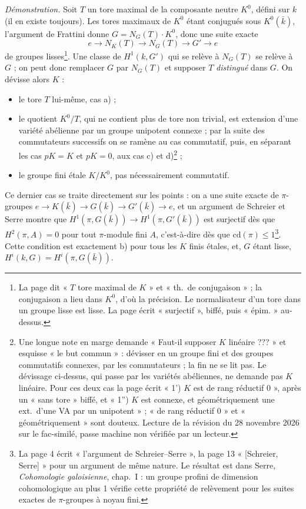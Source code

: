 \documentclass[11pt,a4paper]{article}
\begin{document}
\emph{Démonstration.} Soit $T$ un tore maximal de la composante neutre $K^0$,
défini sur $k$ (il en existe toujours). Les tores maximaux de $K^0$ étant
conjugués sous $K^0(\bar k)$, l'argument de Frattini donne $G = N_G(T) \cdot K^0$,
donc une suite exacte
\[
e \to N_K(T) \to N_G(T) \to G' \to e
\]
de groupes lisses\footnote{La page dit « $T$ tore maximal de $K$ » et « th.\ de
conjugaison » ; la conjugaison a lieu dans $K^0$, d'où la précision. Le
normalisateur d'un tore dans un groupe lisse est lisse. La page écrit
« surjectif », biffé, puis « épim. » au-dessus.}. Une classe de $H^1(k,G')$ qui
se relève à $N_G(T)$ se relève à $G$ ; on peut donc remplacer $G$ par $N_G(T)$ et
supposer $T$ \emph{distingué} dans $G$. On dévisse alors $K$ :
\begin{itemize}
\item le tore $T$ lui-même, cas a) ;
\item le quotient $K^0/T$, qui ne contient plus de tore non trivial, est
extension d'une variété abélienne par un groupe unipotent connexe ; par la
suite des commutateurs successifs on se ramène au cas commutatif, puis, en
séparant les cas $pK = K$ et $pK = 0$, aux cas c) et d)\footnote{Une longue
note en marge demande « Faut-il supposer $K$ linéaire ??? » et esquisse « le
but commun » : dévisser en un groupe fini et des groupes commutatifs connexes,
par les commutateurs ; la fin ne se lit pas. Le dévissage ci-dessus, qui passe
par les variétés abéliennes, ne demande pas $K$ linéaire. Pour ces deux cas la
page écrit « 1') $K$ est de rang réductif $0$ », après un « sans tore » biffé,
et « 1'') $K$ est connexe, et géométriquement une ext.\ d'une VA par un
unipotent » ; « de rang réductif $0$ » et « géométriquement » sont douteux.
Lecture de la révision du 28 novembre 2026 sur le fac-similé, passe machine non
vérifiée par un lecteur.} ;
\item le groupe fini étale $K/K^0$, pas nécessairement commutatif.
\end{itemize}
Ce dernier cas se traite directement sur les points : on a une suite exacte de
$\pi$-groupes $e \to K(\bar k) \to G(\bar k) \to G'(\bar k) \to e$, et un
argument de Schreier et Serre montre que $H^1(\pi,G(\bar k)) \to
H^1(\pi,G'(\bar k))$ est surjectif dès que $H^2(\pi,A) = 0$ pour tout $\pi$-module
fini $A$, c'est-à-dire dès que $\mathrm{cd}(\pi) \leq 1$\footnote{La page 4
écrit « l'argument de Schreier--Serre », la page 13 « [Schreier, Serre] » pour un
argument de même nature. Le résultat est dans Serre, \emph{Cohomologie galoisienne}, chap.~I : un groupe
profini de dimension cohomologique au plus 1 vérifie cette propriété de
relèvement pour les suites exactes de $\pi$-groupes à noyau fini.}. Cette
condition est exactement b) pour tous les $K$ finis étales, et, $G$ étant lisse,
$H^i(k,G) = H^i(\pi,G(\bar k))$.
\end{document}
